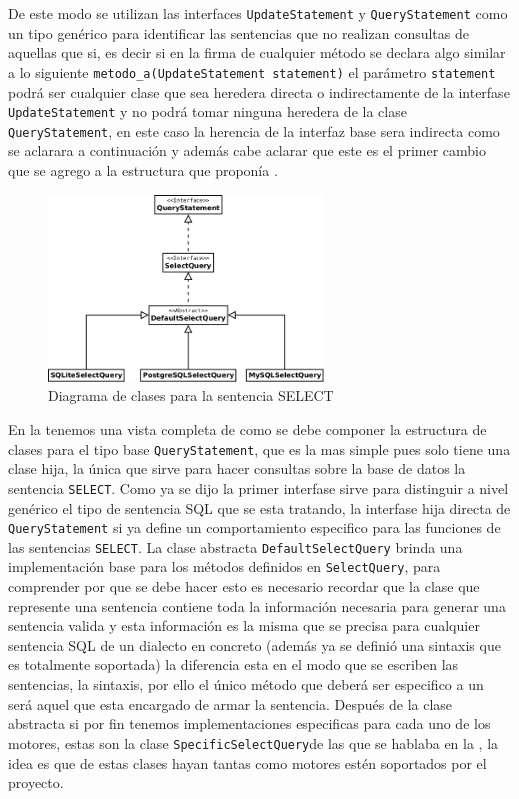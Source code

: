 De este modo se utilizan las interfaces \verb=UpdateStatement= y \verb=QueryStatement= como un tipo genérico para identificar las sentencias que no realizan consultas de aquellas que si, es decir si en la firma de cualquier método se declara algo similar a lo siguiente \verb=metodo_a(UpdateStatement statement)= el parámetro \verb=statement= podrá ser cualquier clase que sea heredera directa o indirectamente de la interfase \verb=UpdateStatement= y no podrá tomar ninguna heredera de la clase \verb=QueryStatement=, en este caso la herencia de la interfaz base sera indirecta como se aclarara a continuación y además cabe aclarar que este es el primer cambio que se agrego a la estructura que proponía \cc.

\begin{figure}
  \centering
    \includegraphics[width=0.65\textwidth]{figuras/crossdb-query.png}
  \caption{Diagrama de clases para la sentencia SELECT}
  \label{fig:query-base}
\end{figure}

En la  tenemos una vista completa de como se debe componer la estructura de clases para el tipo base \verb=QueryStatement=, que es la mas simple pues solo tiene una clase hija, la única que sirve para hacer consultas sobre la base de datos la sentencia \verb=SELECT=. Como ya se dijo la primer interfase sirve para distinguir a nivel genérico el tipo de sentencia SQL que se esta tratando, la interfase hija directa de \verb=QueryStatement= si ya define un comportamiento especifico para las funciones de las sentencias \verb=SELECT=. La clase abstracta \verb=DefaultSelectQuery= brinda una implementación base para los métodos definidos en \verb=SelectQuery=, para comprender por que se debe hacer esto es necesario recordar que la clase que represente una sentencia contiene toda la información necesaria para generar una sentencia valida y esta información es la misma que se precisa para cualquier sentencia SQL de un dialecto en concreto (además ya se definió una sintaxis que es totalmente soportada) la diferencia esta en el modo que se escriben las sentencias, la sintaxis, por ello el único método que deberá ser especifico a un \dd será aquel que esta encargado de armar la sentencia. Después de la clase abstracta si por fin tenemos implementaciones especificas para cada uno de los motores, estas son la clase \verb=SpecificSelectQuery=de las que se hablaba en la , la idea es que de estas clases hayan tantas como motores estén soportados por el proyecto.

